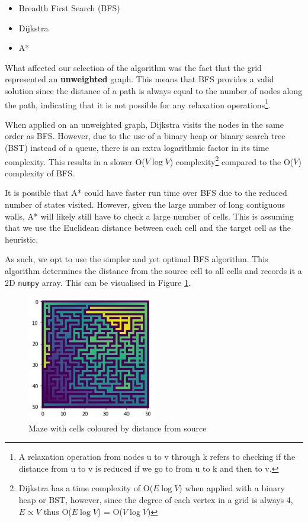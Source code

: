 \documentclass{article}
\begin{document}
    \begin{itemize}
        \item Breadth First Search (BFS)
        \item Dijkstra
        \item A*
    \end{itemize}

    What affected our selection of the algorithm was the fact that the grid represented an \textbf{unweighted} graph. This means that BFS provides a valid solution since the distance of a path is always equal to the number of nodes along the path, indicating that it is not possible for any relaxation operations\footnote{A relaxation operation from nodes u to v through k refers to checking if the distance from u to v is reduced if we go to from u to k and then to v.}.

    When applied on an unweighted graph, Dijkstra visits the nodes in the same order as BFS. However, due to the use of a binary heap or binary search tree (BST) instead of a queue, there is an extra logarithmic factor in its time complexity. This results in a slower O($V \log V$) complexity\footnote{Dijkstra has a time complexity of O($E \log V$) when applied with a binary heap or BST, however, since the degree of each vertex in a grid is always 4, $E \propto V$ thus O($E \log V$) = O($V \log V$)} compared to the O($V$) complexity of BFS.

    It is possible that A* could have faster run time over BFS due to the reduced number of states visited. However, given the large number of long contiguous walls, A* will likely still have to check a large number of cells. This is assuming that we use the Euclidean distance between each cell and the target cell as the heuristic.

    As such, we opt to use the simpler and yet optimal BFS algorithm. This algorithm determines the distance from the source cell to all cells and records it a 2D \texttt{numpy} array. This can be visualised in Figure \ref{fig:dist_array}.

    \begin{figure}[H]
        \centering
        \includegraphics[width=0.5\textwidth]{img/dist_array.png}
        \caption{Maze with cells coloured by distance from source}
        \label{fig:dist_array}
    \end{figure}
\end{document}

